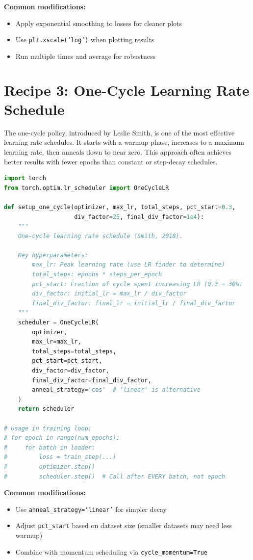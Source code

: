 \documentclass[../main.tex]{subfiles}
\begin{document}
\textbf{Common modifications:}
\begin{itemize}
    \item Apply exponential smoothing to losses for cleaner plots
    \item Use \texttt{plt.xscale('log')} when plotting results
    \item Run multiple times and average for robustness
\end{itemize}

\section{Recipe 3: One-Cycle Learning Rate Schedule}\label{sec:recipe-one-cycle}

The one-cycle policy, introduced by Leslie Smith, is one of the most effective learning rate schedules. It starts with a warmup phase, increases to a maximum learning rate, then anneals down to near zero. This approach often achieves better results with fewer epochs than constant or step-decay schedules.

\begin{lstlisting}[language=Python]
import torch
from torch.optim.lr_scheduler import OneCycleLR

def setup_one_cycle(optimizer, max_lr, total_steps, pct_start=0.3,
                    div_factor=25, final_div_factor=1e4):
    """
    One-cycle learning rate schedule (Smith, 2018).

    Key hyperparameters:
        max_lr: Peak learning rate (use LR finder to determine)
        total_steps: epochs * steps_per_epoch
        pct_start: Fraction of cycle spent increasing LR (0.3 = 30%)
        div_factor: initial_lr = max_lr / div_factor
        final_div_factor: final_lr = initial_lr / final_div_factor
    """
    scheduler = OneCycleLR(
        optimizer,
        max_lr=max_lr,
        total_steps=total_steps,
        pct_start=pct_start,
        div_factor=div_factor,
        final_div_factor=final_div_factor,
        anneal_strategy='cos'  # 'linear' is alternative
    )
    return scheduler

# Usage in training loop:
# for epoch in range(num_epochs):
#     for batch in loader:
#         loss = train_step(...)
#         optimizer.step()
#         scheduler.step()  # Call after EVERY batch, not epoch
\end{lstlisting}

\textbf{Common modifications:}
\begin{itemize}
    \item Use \texttt{anneal\_strategy='linear'} for simpler decay
    \item Adjust \texttt{pct\_start} based on dataset size (smaller datasets may need less warmup)
    \item Combine with momentum scheduling via \texttt{cycle\_momentum=True}
\end{itemize}
\end{document}
